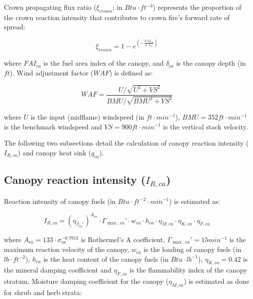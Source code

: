 \documentclass[]{book}
\begin{document}
Crown propagating flux ratio (\(\xi_{crown}\); in \(Btu \cdot ft^{-3}\))
represents the proportion of the crown reaction intensity that
contributes to crown fire's forward rate of spread:

\begin{equation}
\xi_{crown} = 1 - e^{\left(-\frac{FAI_{ca}}{4 \cdot \delta_{ca}}\right)}
\end{equation}

where \(FAI_{ca}\) is the fuel area index of the canopy, and
\(\delta_{ca}\) is the canopy depth (in \(ft\)). Wind adjustment factor
(\(WAF\)) is defined as:

\begin{equation}
WAF = \frac{U/\sqrt{U^2+VS^2}}{BMU/\sqrt{BMU^2+VS^2}}
\end{equation}

where \(U\) is the input (midflame) windspeed (in
\(ft \cdot min^{-1}\)), \(BMU = 352 ft \cdot min^{-1}\) is the benchmark
windspeed and \(VS = 900 ft \cdot min^{-1}\) is the vertical stack
velocity.

The following two subsections detail the calculation of canopy reaction
intensity (\(I_{R, ca}\)) and canopy heat sink (\(q_{ca}\)).

\subsection{\texorpdfstring{Canopy reaction intensity
(\(I_{R, ca}\))}{Canopy reaction intensity (I\_\{R, ca\})}}\label{canopy-reaction-intensity-i_r-ca}

Reaction intensity of canopy fuels (in
\(Btu \cdot ft^{-2} \cdot min^{-1}\)) is estimated as:

\begin{equation}
I_{R,ca} = (\eta_{\beta_{ca}'})^{A_{ca}}\cdot \Gamma_{\max, ca}'\cdot w_{ca} \cdot h_{ca} \cdot \eta_{M,ca}\cdot \eta_{K,ca}\cdot \eta_{F,ca}
\end{equation}

where \(A_{ca} = 133\cdot \sigma_{ca}^{-0.7913}\) is Rothermel's A
coefficient, \(\Gamma_{\max, ca}' = 15 min^{-1}\) is the maximum
reaction velocity of the canopy, \(w_{ca}\) is the loading of canopy
fuels (in \(lb \cdot ft^{-2}\)), \(h_{ca}\) is the heat content of the
canopy fuels (in \(Btu \cdot lb^{-1}\)), \(\eta_{K,ca}=0.42\) is the
mineral damping coefficient and \(\eta_{F,ca}\) is the flammability
index of the canopy stratum. Moisture damping coefficient for the canopy
(\(\eta_{M,ca}\)) is estimated as done for shrub and herb strata:
\end{document}
